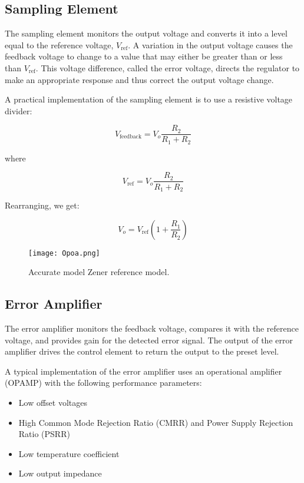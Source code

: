 \documentclass[a4paper,9pt,twoside,openany,twocolumn]{memoir}
\begin{document}
\subsection{Sampling Element}

The sampling element monitors the output voltage and converts it into a level equal to the reference voltage, \( V_{\text{ref}} \). A variation in the output voltage causes the feedback voltage to change to a value that may either be greater than or less than \( V_{\text{ref}} \). This voltage difference, called the error voltage, directs the regulator to make an appropriate response and thus correct the output voltage change.

A practical implementation of the sampling element is to use a resistive voltage divider:

\[
V_{\text{feedback}} = V_o \frac{R_2}{R_1 + R_2} \tag{1}
\]

where

\[
V_{\text{ref}} = V_o \frac{R_2}{R_1 + R_2} \tag{2}
\]

Rearranging, we get:

\[
V_o = V_{\text{ref}} \left( 1 + \frac{R_1}{R_2} \right)
\]
\begin{figure}[H] %
    \centering
    \texttt{[image: Opoa.png]} %
    \caption{Accurate model Zener reference model.}
    \label{fig:accurate-zener-reference} %
\end{figure}
\subsection{Error Amplifier}

The error amplifier monitors the feedback voltage, compares it with the reference voltage, and provides gain for the detected error signal. The output of the error amplifier drives the control element to return the output to the preset level. 

A typical implementation of the error amplifier uses an operational amplifier (OPAMP) with the following performance parameters:
\begin{itemize}
    \item Low offset voltages
    \item High Common Mode Rejection Ratio (CMRR) and Power Supply Rejection Ratio (PSRR)
    \item Low temperature coefficient
    \item Low output impedance
\end{itemize}
\end{document}
